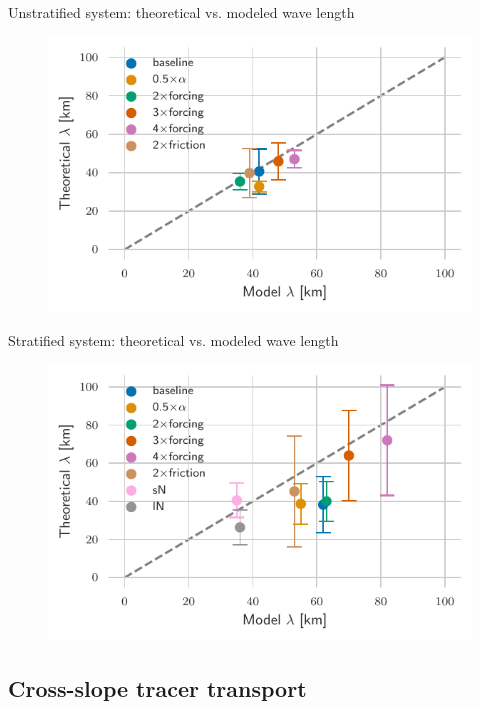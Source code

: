 \documentclass{beamer}
\begin{document}
\begin{frame}{Unstratified system: theoretical vs. modeled wave length}
\begin{figure}
\centering
\includegraphics{figures/Unstratified_theoreticalVSmodel_wave_length.pdf}
\end{figure}
\end{frame}

\begin{frame}{Stratified system: theoretical vs. modeled wave length}
\begin{figure}
\centering
\includegraphics{figures/Stratified_theoreticalVSmodel_wave_length_xzshear.pdf}
\end{figure}
\end{frame}

\subsection{Cross-slope tracer transport}
\end{document}

